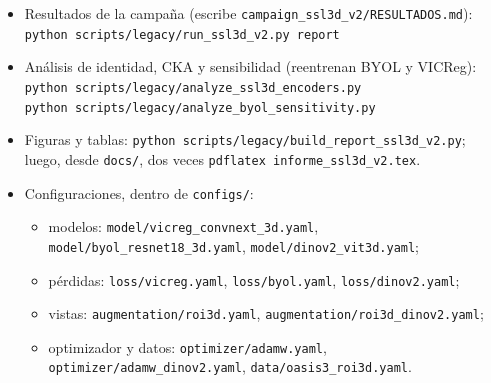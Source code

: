 \documentclass[11pt,a4paper]{article}
\begin{document}
\begin{itemize}
\item Resultados de la campaña (escribe \texttt{campaign\_ssl3d\_v2/RESULTADOS.md}):\\
  \texttt{python scripts/legacy/run\_ssl3d\_v2.py report}
\item Análisis de identidad, CKA y sensibilidad (reentrenan BYOL y VICReg):\\
  \texttt{python scripts/legacy/analyze\_ssl3d\_encoders.py}\\
  \texttt{python scripts/legacy/analyze\_byol\_sensitivity.py}
\item Figuras y tablas: \texttt{python scripts/legacy/build\_report\_ssl3d\_v2.py}; luego, desde
  \texttt{docs/}, dos veces \texttt{pdflatex informe\_ssl3d\_v2.tex}.
\item Configuraciones, dentro de \texttt{configs/}:
  \begin{itemize}
  \item modelos: \texttt{model/vicreg\_convnext\_3d.yaml}, \texttt{model/byol\_resnet18\_3d.yaml},
    \texttt{model/dinov2\_vit3d.yaml};
  \item pérdidas: \texttt{loss/vicreg.yaml}, \texttt{loss/byol.yaml}, \texttt{loss/dinov2.yaml};
  \item vistas: \texttt{augmentation/roi3d.yaml}, \texttt{augmentation/roi3d\_dinov2.yaml};
  \item optimizador y datos: \texttt{optimizer/adamw.yaml}, \texttt{optimizer/adamw\_dinov2.yaml},
    \texttt{data/oasis3\_roi3d.yaml}.
  \end{itemize}
\end{itemize}
\end{document}
